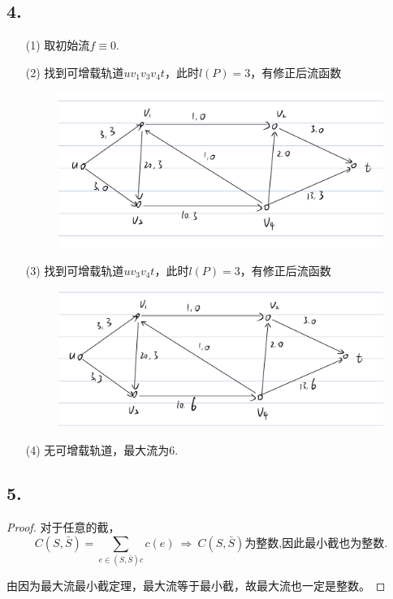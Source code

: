\documentclass{article}
\begin{document}
\subsection*{4.}
\begin{enumerate}
    \item [(1)]取初始流$f\equiv 0$.
    \item [(2)]找到可增载轨道$u v_1 v_3 v_4 t$，此时$l(P)=3$，有修正后流函数
    
    \begin{figure}[htbp]
        \centering
        \includegraphics[scale=0.2]{42.PNG}
    \end{figure}

    \item [(3)]找到可增载轨道$u v_3 v_4 t$，此时$l(P)=3$，有修正后流函数
    \begin{figure}[htbp]
        \centering
        \includegraphics[scale=0.2]{43.PNG}
    \end{figure}

    \item [(4)]无可增载轨道，最大流为6.
\end{enumerate}

\subsection*{5.}
\begin{proof}
    对于任意的截，
    \[
        C(S,\bar{S})=\sum_{e\in (S,\bar{S})c}c(e)
        \ \Rightarrow\ 
        C(S,\bar{S})\mbox{为整数,因此最小截也为整数.}
    \]

    由因为最大流最小截定理，最大流等于最小截，故最大流也一定是整数。
\end{proof}
\end{document}
